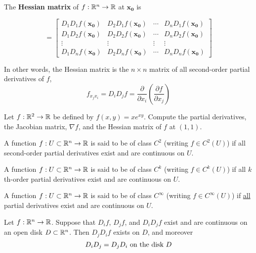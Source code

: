 \begin{proposition}
    The \textbf{Hessian matrix} of $f:\mathbb{R}^n \to \mathbb{R}$ at $\bm{x_0}$ is 
    
    \begin{equation*}
        [H_f(\bm{x_0})] = \begin{bmatrix}
D_1D_1f(\bm{x_0}) & D_2D_1f(\bm{x_0}) & \cdots & D_nD_1f(\bm{x_0}) \\
D_1D_2f(\bm{x_0}) & D_2D_2f(\bm{x_0}) & \cdots & D_nD_2f(\bm{x_0}) \\
\vdots & \vdots & \vdots & \vdots\\
D_1D_nf(\bm{x_0}) & D_2D_nf(\bm{x_0}) & \cdots & D_nD_nf(\bm{x_0}) 
\end{bmatrix}
    \end{equation*}
\end{proposition}

In other words, the Hessian matrix is the $n \times n$ matrix of all second-order partial derivatives of $f$,
    $$f_{x_jx_i} = D_iD_j f = \frac{\partial}{\partial x_i}\left(\frac{\partial f}{\partial x_j}\right)$$


\begin{example}
    Let $f : \mathbb{R}^2 \to \mathbb{R}$ be defined by $f(x,y)= xe^{xy}$.  Compute the partial derivatives, the Jacobian matrix, $\nabla f$, and the Hessian matrix of $f$ at $(1,1)$.
\end{example}

\begin{definition}
        A function $f : U \subset \mathbb{R}^n \to \mathbb{R}$ is said to be of class $C^2$ (writing $f \in C^2(U)$) if all second-order partial derivatives exist and are continuous on $U$.
    \end{definition}


    \begin{definition}
        A function $f : U \subset \mathbb{R}^n \to \mathbb{R}$ is said to be of class $C^k$ (writing $f \in C^k(U)$) if all $k$th-order partial derivatives exist and are continuous on $U$.
    \end{definition}


    \begin{definition}
        A function $f : U \subset \mathbb{R}^n \to \mathbb{R}$ is said to be of class $C^\infty$ (writing $f \in C^\infty(U)$) if \underline{all} partial derivatives exist and are continuous on $U$.
    \end{definition}

\begin{theorem}
    
    Let $f: \mathbb{R}^n \to \mathbb{R}$.  Suppose that $D_if$, $D_jf$, and $D_iD_jf$ exist and are continuous on an open disk $D \subset \mathbb{R}^n$.  Then $D_jD_if$ exists on $D$, and moreover
    $$D_iD_j = D_jD_i\ \textnormal{on the disk} \ D$$
    
    \end{theorem}

